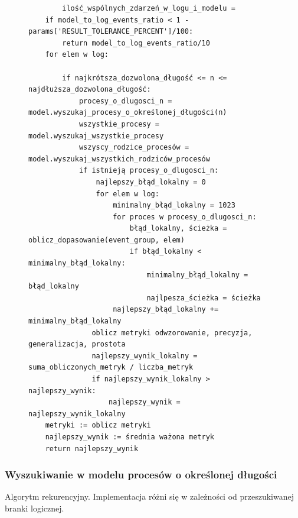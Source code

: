 \begin{figure}[!ht]
\begin{lstlisting}
    	ilość_wspólnych_zdarzeń_w_logu_i_modelu = 			   
	if model_to_log_events_ratio < 1 - params['RESULT_TOLERANCE_PERCENT']/100:
        return model_to_log_events_ratio/10
	for elem w log:
		
        if najkrótsza_dozwolona_długość <= n <= najdłuższa_dozwolona_długość:
            procesy_o_dlugosci_n = model.wyszukaj_procesy_o_określonej_długości(n)
            wszystkie_procesy = model.wyszukaj_wszystkie_procesy
            wszyscy_rodzice_procesów = model.wyszukaj_wszystkich_rodziców_procesów
            if istnieją procesy_o_dlugosci_n:
                najlepszy_błąd_lokalny = 0
                for elem w log:
                    minimalny_błąd_lokalny = 1023
                    for proces w procesy_o_dlugosci_n:
                        błąd_lokalny, ścieżka = oblicz_dopasowanie(event_group, elem)
                        if błąd_lokalny < minimalny_błąd_lokalny:
                            minimalny_błąd_lokalny = błąd_lokalny
                            najlpesza_ścieżka = ścieżka
                    najlepszy_błąd_lokalny += minimalny_błąd_lokalny
               oblicz metryki odwzorowanie, precyzja, generalizacja, prostota 
               najlepszy_wynik_lokalny = suma_obliczonych_metryk / liczba_metryk
               if najlepszy_wynik_lokalny > najlepszy_wynik:
                   najlepszy_wynik = najlepszy_wynik_lokalny
	metryki := oblicz metryki 
	najlepszy_wynik := średnia ważona metryk
    return najlepszy_wynik
\end{lstlisting}
\end{figure}

\subsubsection{Wyszukiwanie w modelu procesów o określonej długości}

Algorytm rekurencyjny. Implementacja różni się w zależności od przeszukiwanej branki logicznej.
\begin{figure}[!ht]
\lstset{caption=Wyszukiwanie procesów o długości n, captionpos=b}
\lstset{label=src:get_n_length, frame=single}
\begin{lstlisting}
\end{lstlisting}
\end{figure}

